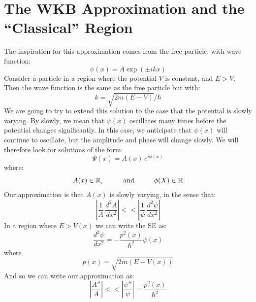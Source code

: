 \documentclass[12pt]{book}
\begin{document}
\section{The WKB Approximation and the ``Classical'' Region}

The inspiration for this approximation comes from the free particle, with wave function:
$$\psi(x) = A \exp(\pm ikx)$$
Consider a particle in a region where the potential $V$ is constant, and $E>V$.  Then the wave function is the same as the free particle but with:
$$k=\sqrt{2m(E-V)}/\hbar$$
We are going to try to extend this solution to the case that the potential is slowly varying.  By slowly, we mean that $\psi(x)$ oscillates many times before the potential changes significantly.  In this case, we anticipate that $\psi(x)$ will continue to oscillate, but the amplitude and phase will change slowly.  We will therefore look for solutions of the form:
\begin{equation}
\Psi(x) = A(x) \, e^{\displaystyle i \phi(x)}
\end{equation}
where:
$$A(x) \in \mathbb{R}, \hspace{1cm} {\rm and} \hspace{1cm} \phi(X) \in \mathbb{R}$$
Our approximation is that $A(x)$ is slowly varying, in the sense that:
$$\left| \frac{1}{A} \, \frac{d^2A}{dx^2}\right| << \left| \frac{1}{\psi}\,\frac{d^2 \psi}{dx^2} \right|$$
In a region where $E > V(x)$ we can write the SE as:
\begin{equation}
\label{eqn:wkbse}
\frac{d^2 \psi}{d x^2} = -\frac{p^2(x)}{\hbar^2} \psi(x)
\end{equation}
where
$$p(x) = \sqrt{2m(E-V(x))}$$
And so we can write our approximation as:
$$\left| \frac{A''}{A} \right| << \left| \frac{\psi''}{\psi} \right| = \frac{p^2(x)}{\hbar^2}$$
\end{document}
